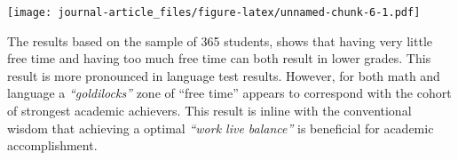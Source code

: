 \documentclass[
]{article}
\newenvironment{Shaded}{\begin{snugshade}}{\end{snugshade}}
\newcommand{\DataTypeTok}[1]{\textcolor[rgb]{0.13,0.29,0.53}{#1}}
\newcommand{\DecValTok}[1]{\textcolor[rgb]{0.00,0.00,0.81}{#1}}
\newcommand{\KeywordTok}[1]{\textcolor[rgb]{0.13,0.29,0.53}{\textbf{#1}}}
\newcommand{\NormalTok}[1]{#1}
\newcommand{\OperatorTok}[1]{\textcolor[rgb]{0.81,0.36,0.00}{\textbf{#1}}}
\newcommand{\OtherTok}[1]{\textcolor[rgb]{0.56,0.35,0.01}{#1}}
\newcommand{\StringTok}[1]{\textcolor[rgb]{0.31,0.60,0.02}{#1}}
\begin{document}
\begin{Shaded}
\end{Shaded}

\texttt{[image: journal-article\_files/figure-latex/unnamed-chunk-6-1.pdf]}

The results based on the sample of 365 students, shows that having very
little free time and having too much free time can both result in lower
grades. This result is more pronounced in language test results.
However, for both math and language a \emph{``goldilocks''} zone of
``free time'' appears to correspond with the cohort of strongest
academic achievers. This result is inline with the conventional wisdom
that achieving a optimal \emph{``work live balance''} is beneficial for
academic accomplishment.
\end{document}
